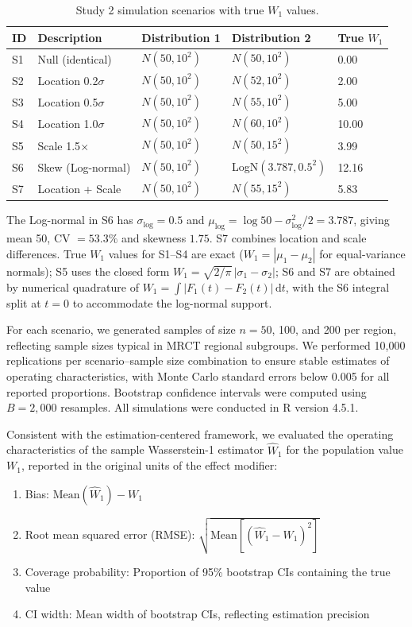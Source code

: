 \begin{table}[ht]
\centering
\caption{Study 2 simulation scenarios with true $W_1$ values.\label{tab:scenarios}}
\begin{tabular}{lllll}
\toprule
\textbf{ID} & \textbf{Description} & \textbf{Distribution 1} & \textbf{Distribution 2} & \textbf{True $W_1$} \\
\midrule
S1 & Null (identical) & $N(50, 10^2)$ & $N(50, 10^2)$ & 0.00 \\
S2 & Location 0.2$\sigma$ & $N(50, 10^2)$ & $N(52, 10^2)$ & 2.00 \\
S3 & Location 0.5$\sigma$ & $N(50, 10^2)$ & $N(55, 10^2)$ & 5.00 \\
S4 & Location 1.0$\sigma$ & $N(50, 10^2)$ & $N(60, 10^2)$ & 10.00 \\
S5 & Scale 1.5$\times$ & $N(50, 10^2)$ & $N(50, 15^2)$ & 3.99 \\
S6 & Skew (Log-normal) & $N(50, 10^2)$ & LogN$(3.787, 0.5^2)$ & 12.16 \\
S7 & Location + Scale & $N(50, 10^2)$ & $N(55, 15^2)$ & 5.83 \\
\bottomrule
\end{tabular}
\begin{tablenotes}
\item The Log-normal in S6 has $\sigma_{\log} = 0.5$ and $\mu_{\log} = \log 50 - \sigma_{\log}^2/2 = 3.787$, giving mean 50, CV $= 53.3\%$ and skewness $1.75$. S7 combines location and scale differences. True $W_1$ values for S1--S4 are exact ($W_1 = |\mu_1 - \mu_2|$ for equal-variance normals); S5 uses the closed form $W_1 = \sqrt{2/\pi}\,|\sigma_1 - \sigma_2|$; S6 and S7 are obtained by numerical quadrature of $W_1 = \int |F_1(t) - F_2(t)|\,\mathrm{d}t$, with the S6 integral split at $t = 0$ to accommodate the log-normal support.
\end{tablenotes}
\end{table}

For each scenario, we generated samples of size $n = 50$, 100, and 200 per region, reflecting sample sizes typical in MRCT regional subgroups. We performed 10{,}000 replications per scenario--sample size combination to ensure stable estimates of operating characteristics, with Monte Carlo standard errors below 0.005 for all reported proportions. Bootstrap confidence intervals were computed using $B = 2{,}000$ resamples. All simulations were conducted in R version 4.5.1.

Consistent with the estimation-centered framework, we evaluated the operating characteristics of the sample Wasserstein-1 estimator $\widehat{W}_1$ for the population value $W_1$, reported in the original units of the effect modifier:
\begin{enumerate}[1.]
\item Bias: $\text{Mean}(\widehat{W}_1) - W_1$
\item Root mean squared error (RMSE): $\sqrt{\text{Mean}[(\widehat{W}_1 - W_1)^2]}$
\item Coverage probability: Proportion of 95\% bootstrap CIs containing the true value
\item CI width: Mean width of bootstrap CIs, reflecting estimation precision
\end{enumerate}
